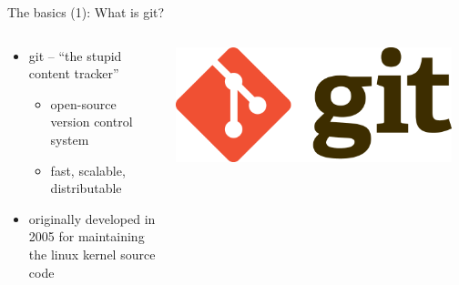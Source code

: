 \begin{frame}{The basics (1): What is git?}
  \begin{columns}[onlytextwidth]
    \begin{column}{0.6\textwidth}
      \begin{itemize}
        \item git -- ``the stupid content tracker''
        \begin{itemize}
          \item open-source version control system
          \item fast, scalable, distributable
        \end{itemize}
        \item originally developed in 2005 for maintaining the linux kernel source code
      \end{itemize}
    \end{column}
    \begin{column}[t]{0.4\textwidth}
      \includegraphics[width=0.95\textwidth]{imgs/git_logo}
    \end{column}
  \end{columns}
\end{frame}

